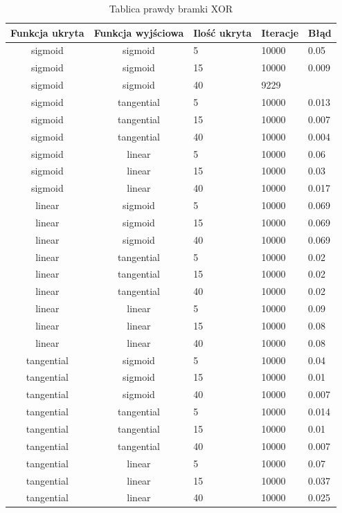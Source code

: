 \documentclass[pointlessnumbers, abstracton, headsepline, a4paper]{scrartcl}
\begin{document}
\begin{table}[h]
\centering
\begin{tabular}[t]{c|c|l|l|l}
Funkcja ukryta & Funkcja wyjściowa & Ilość ukryta & Iteracje & Błąd \\
\hline
sigmoid & sigmoid & 5 & 10000 & 0.05 \\
sigmoid & sigmoid & 15 & 10000 & 0.009 \\
sigmoid & sigmoid & 40 & 9229 & \\
sigmoid & tangential & 5 & 10000 & 0.013 \\
sigmoid & tangential & 15 & 10000 & 0.007 \\
sigmoid & tangential & 40 & 10000 & 0.004 \\
sigmoid & linear & 5 & 10000 & 0.06 \\
sigmoid & linear & 15 & 10000 & 0.03 \\
sigmoid & linear & 40 & 10000 & 0.017 \\
linear & sigmoid & 5 & 10000 & 0.069 \\
linear & sigmoid & 15 & 10000 & 0.069 \\
linear & sigmoid & 40 & 10000 & 0.069 \\
linear & tangential & 5 & 10000 & 0.02 \\
linear & tangential & 15 & 10000 & 0.02 \\
linear & tangential & 40 & 10000 & 0.02 \\
linear & linear & 5 & 10000 & 0.09 \\
linear & linear & 15 & 10000 & 0.08 \\
linear & linear & 40 & 10000 & 0.08 \\
tangential & sigmoid & 5 & 10000 & 0.04 \\
tangential & sigmoid & 15 & 10000 & 0.01 \\
tangential & sigmoid & 40 & 10000 & 0.007 \\
tangential & tangential & 5 & 10000 & 0.014 \\
tangential & tangential & 15 & 10000 & 0.01 \\
tangential & tangential & 40 & 10000 & 0.007 \\
tangential & linear & 5 & 10000 & 0.07 \\
tangential & linear & 15 & 10000 & 0.037 \\
tangential & linear & 40 & 10000 & 0.025 \\
\end{tabular}
\caption{\label{tab:xor}Tablica prawdy bramki XOR}
\end{table}
\end{document}
